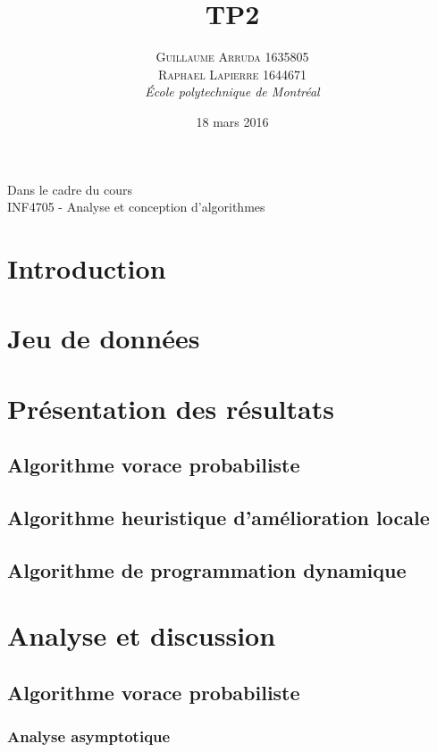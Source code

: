 \documentclass[a4paper, 12pt]{article} %
\title{TP2}
\author{\textsc{Guillaume Arruda 1635805\\Raphael Lapierre 1644671} %
\vspace{10pt}
\\{\textit{École polytechnique de Montréal}}} %
\date{18 mars 2016} %
\makeatletter
\renewcommand{\maketitle}{ %
\begin{center} %

\vspace*{25pt} %
{\LARGE\@title} %

\vspace{125pt} %

{\large\@author} %

\vspace{125pt} %
Dans le cadre du cours
\\INF4705 - Analyse et conception d'algorithmes
\vspace{125pt} %
\\\@date %
\vspace{125pt} %

\end{center}
}
\makeatother
\begin{document}
\thispagestyle{empty}
\clearpage\maketitle %
\pagebreak[4]
\tableofcontents
\pagebreak[4]

\setlength{\headheight}{15.0pt}
\pagestyle{fancy}
\fancyhead[C]{}

\section*{Introduction}
\section*{Jeu de données}
\section*{Présentation des résultats}
\subsection*{Algorithme vorace probabiliste}
\subsection*{Algorithme heuristique d'amélioration locale}
\subsection*{Algorithme de programmation dynamique}
\section*{Analyse et discussion}
\subsection*{Algorithme vorace probabiliste}
\subsubsection*{Analyse asymptotique}
\end{document}
